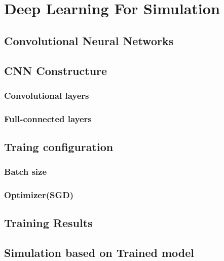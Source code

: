 \chapter{Deep Learning For Simulation}


\section{Convolutional Neural Networks}

\section{CNN Constructure}
    \subsection{Convolutional layers}

    \subsection{Full-connected layers}

\section{Traing configuration}
    \subsection{Batch size}

    \subsection{Optimizer(SGD)}

\section{Training Results}

\section{Simulation based on Trained model}